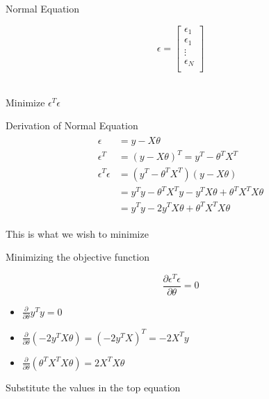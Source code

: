\documentclass{beamer}
\begin{document}
\begin{frame}{Normal Equation}
    
\begin{equation*}
 \epsilon = 
\begin{bmatrix}
    \epsilon_{1} \\
    \epsilon_{1} \\
    \vdots \\
    \epsilon_{N} \\
\end{bmatrix}
\end{equation*}
\\
\begin{center}
    Minimize $\epsilon^{T}\epsilon$    
\end{center}
\end{frame}

\begin{frame}{Derivation of Normal Equation}
\begin{align}
\label{eqn*:eqlabel}
\begin{split}
   \epsilon &= y - X\theta \\
\epsilon^{T} &= (y-X\theta)^{T} = y^{T} - \theta^{T}X^{T}\\
\epsilon^{T}\epsilon &= (y^{T} - \theta^{T}X^{T})(y - X\theta)\\
&=y^{T}y - \theta^{T}X^{T}y - y^{T}X\theta+\theta^{T}X^{T}X\theta\\
&=y^{T}y - 2y^{T}X\theta+\theta^{T}X^{T}X\theta
\end{split}
\end{align}

This is what we wish to minimize
\end{frame}

\begin{frame}{Minimizing the objective function}
    
    
    \begin{equation}
        \frac{\partial \epsilon^{T} \epsilon}{\partial \theta} = 0    
    \end{equation}
    
    
    
    \begin{itemize}
        \item $
    \frac{\partial }{\partial \theta} y^{T}y= 0
    $
    \item $
    \frac{\partial }{\partial \theta}(-2y^{T}X\theta ) = (-2y^{T}X)^{T} = -2X^{T}y
    $
    \item $ \frac{\partial}{\partial\theta} (\theta^{T}X^{T}X\theta) = 2X^{T}X\theta$
    \end{itemize}
    
    Substitute the values in the top equation
    
\end{frame}
\end{document}
